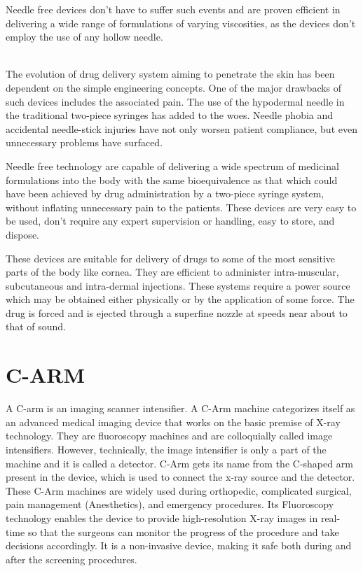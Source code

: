 \documentclass[12pt]{article}
\begin{document}
 Needle free devices don't have to suffer such events and are proven efficient in delivering a wide range of formulations of varying viscosities, as the devices don't employ the use of any hollow needle.
 
 \\

 The evolution of drug delivery system aiming to penetrate the skin has been dependent on the simple engineering concepts. One of the major drawbacks of such devices includes the associated pain. The use of the hypodermal needle in the traditional two-piece syringes has added to the woes. Needle phobia and accidental needle-stick injuries have not only worsen patient compliance, but even unnecessary problems have surfaced.

Needle free technology are capable of delivering a wide spectrum of medicinal formulations into the body with the same bioequivalence as that which could have been achieved by drug administration by a two-piece syringe system, without inflating unnecessary pain to the patients. These devices are very easy to be used, don't require any expert supervision or handling, easy to store, and dispose.

These devices are suitable for delivery of drugs to some of the most sensitive parts of the body like cornea. They are efficient to administer intra-muscular, subcutaneous and intra-dermal injections. These systems require a power source which may be obtained either physically or by the application of some force. The drug is forced and is ejected through a superfine nozzle at speeds near about to that of sound.

\newpage

\section{C-ARM}

A C-arm is an imaging scanner intensifier. A C-Arm machine categorizes itself as an advanced medical imaging device that works on the basic premise of X-ray technology. They are fluoroscopy machines and are colloquially called image intensifiers. However, technically, the image intensifier is only a part of the machine and it is called a detector. C-Arm gets its name from the C-shaped arm present in the device, which is used to connect the x-ray source and the detector. These C-Arm machines are widely used during orthopedic, complicated surgical, pain management (Anesthetics), and emergency procedures. Its Fluoroscopy technology enables the device to provide high-resolution X-ray images in real-time so that the surgeons can monitor the progress of the procedure and take decisions accordingly. It is a non-invasive device, making it safe both during and after the screening procedures.
\end{document}
